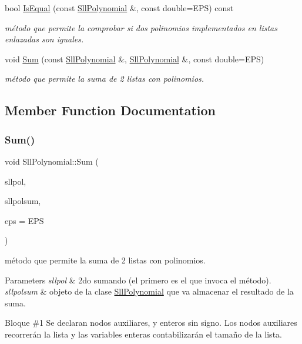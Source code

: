 \begin{DoxyCompactItemize}
bool \hyperlink{classSllPolynomial_a173ebaed12d4851de81030ad04f6af4a}{Is\+Equal} (const \hyperlink{classSllPolynomial}{Sll\+Polynomial} \&, const double=E\+PS) const
\begin{DoxyCompactList}\small\item\em método que permite la comprobar si dos polinomios implementados en listas enlazadas son iguales. \end{DoxyCompactList}\item 
void \hyperlink{classSllPolynomial_a005626be0181e7531d737c780a6d6ffa}{Sum} (const \hyperlink{classSllPolynomial}{Sll\+Polynomial} \&, \hyperlink{classSllPolynomial}{Sll\+Polynomial} \&, const double=E\+PS)
\begin{DoxyCompactList}\small\item\em método que permite la suma de 2 listas con polinomios. \end{DoxyCompactList}\end{DoxyCompactItemize}


\subsection{Member Function Documentation}
\mbox{\label{classSllPolynomial_a005626be0181e7531d737c780a6d6ffa}} 
\subsubsection{\texorpdfstring{Sum()}{Sum()}}
{\footnotesize\ttfamily void Sll\+Polynomial\+::\+Sum (\begin{DoxyParamCaption}\item[{const \hyperlink{classSllPolynomial}{Sll\+Polynomial} \&}]{sllpol,  }\item[{\hyperlink{classSllPolynomial}{Sll\+Polynomial} \&}]{sllpolsum,  }\item[{const double}]{eps = {\ttfamily EPS} }\end{DoxyParamCaption})}



método que permite la suma de 2 listas con polinomios. 


\begin{DoxyParams}{Parameters}
{\em sllpol} & 2do sumando (el primero es el que invoca el método). \\
\hline
{\em sllpolsum} & objeto de la clase \hyperlink{classSllPolynomial}{Sll\+Polynomial} que va almacenar el resultado de la suma. \\
\hline
\end{DoxyParams}
Bloque \#1 Se declaran nodos auxiliares, y enteros sin signo. Los nodos auxiliares recorrerán la lista y las variables enteras contabilizarán el tamaño de la lista.

